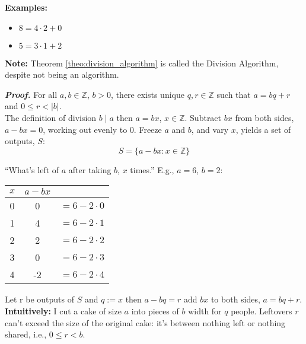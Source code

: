\noindent
\textbf{Examples:}
\begin{itemize}
    \item $8=4\cdot2+0$
    \item $5=3\cdot1+2$
\end{itemize}

\begin{Note}
    \textbf{Note:} Theorem \autoref{theo:division_algorithm} is called the Division Algorithm, despite not being an algorithm.
\end{Note}

\newpage

\begin{Proof} 

    \label{proof:division_algorithm}

    \textit{\textbf{Proof.}} For all $a,b\in\mathbb{Z}$, $b>0$, there exists unique $q,r\in\mathbb{Z}$ such that $a=bq+r$ and $0\leq r<|b|$.\\

    \noindent
    The definition of division $b\mid a$ then $a=bx$, $x\in\mathbb{Z}$. Subtract $bx$ from both sides, $a-bx=0$, working out evenly to 0.
    Freeze $a$ and $b$, and vary $x$, yields a set of outputs, $S$:
    \large{$$S=\{a-bx:x\in\mathbb{Z}\}$$}
    \normalsize
    \begin{center}
        ``What's left of $a$ after taking $b$, $x$ times.'' E.g., $a=6$, $b=2$:
    \end{center}
    \begin{center}
        \begin{tabular}{c|cc}
            $x$ & $a-bx$                \\
            \hline
            0   & 0      & $=6-2\cdot0$ \\
            1   & 4      & $=6-2\cdot1$ \\
            2   & 2      & $=6-2\cdot2$ \\
            3   & 0      & $=6-2\cdot3$ \\
            \hline
            4   & -2     & $=6-2\cdot4$ \\
        \end{tabular}
    \end{center}

    \noindent
    Let r be outputs of $S$ and $q:=x$ then $a-bq=r$ add $bx$ to both sides, \underline{$a=bq+r$}.\\

    \noindent
    \textbf{Intuitively:} I cut a cake of size $a$ into pieces of $b$ width for $q$ people. Leftovers $r$
    can't exceed the size of the original cake: it's between nothing left or nothing shared, i.e., \underline{$0\leq r<b$}.\\


\end{Proof}
